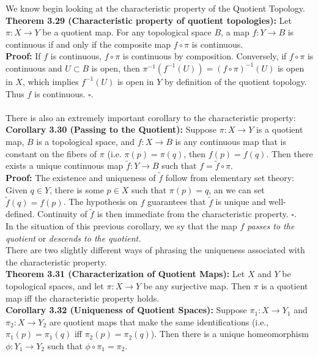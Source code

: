 \documentclass{article}
\begin{document}
  We know begin looking at the characteristic property of the Quotient Topology.\\
  \textbf{Theorem 3.29 (Characteristic property of quotient topologies):} Let \(\pi:X\to Y\) be a quotient map. For any topological space \(B\), a map \(f:Y\to B\) is continuous if and only if the composite map \(f\circ \pi\) is continuous.\\

  \textbf{Proof:} If \(f\) is continuous, \(f\circ\pi\) is continuous by composition. Conversely, if \(f\circ\pi\) is continuous and \(U\subset B\) is open, then \(\pi^{-1}(f^{-1}(U))=(f\circ\pi)^{-1}(U)\) is open in \(X\), which implies \(f^{-1}(U)\) is open in \(Y\) by definition of the quotient topology. Thus \(f\) is continuous. \(\square\).\\
  \\
  There is also an extremely important corollary to the characteristic property:\\
  \textbf{Corollary 3.30 (Passing to the Quotient):} Suppose \(\pi:X\to Y\) is a quotient map, \(B\) is a topological space, and \(f:X\to B\) is any continuous map that is constant on the fibers of \(\pi\) (i.e. \(\pi(p)=\pi(q)\), then \(f(p)=f(q)\). Then there exists a unique continuous map $\tilde{f}:Y\to B$ such that \(f=\tilde{f}\circ\pi\).\\
  \textbf{Proof:} The existence and uniqueness of \(\tilde{f}\) follow from elementary set theory: Given \(q\in Y\), there is some \(p\in X\) such that \(\pi(p)=q\), an we can set \(\tilde{f}(q)=f(p)\). The hypothesis on \(f\) guarantees that \(\tilde{f}\) is unique and well-defined. Continuity of \(\tilde{f}\) is then immediate from the characteristic property. \(\square\).\\

  In the situation of this previous corollary, we sy that the map \(f\) \textit{passes to the quotient} or \textit{descends to the quotient.}\\
  There are two slightly different ways of phrasing the uniqueness associated with the characteristic property.\\
  \textbf{Theorem 3.31 (Characterization of Quotient Maps):} Let \(X\) and \(Y\) be topological spaces, and let \(\pi:X\to Y\) be any surjective map. Then \(\pi\) is a quotient map iff the characteristic property holds.\\

  \textbf{Corollary 3.32 (Uniqueness of Quotient Spaces):} Suppose \(\pi_1:X\to Y_1\) and \(\pi_2:X\to Y_2\) are quotient maps that make the same identifications (i.e., \(\pi_1(p)=\pi_1(q)\) iff \(\pi_2(p)=\pi_2(q)\)). Then there is a unique homeomorphism \(\phi:Y_1\to Y_2\) such that \(\phi\circ \pi_1=\pi_2\).\\
\end{document}
